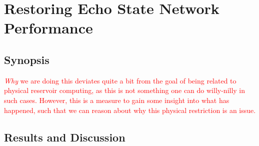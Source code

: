 \section{Restoring Echo State Network Performance}

\subsection{Synopsis}

\textcolor{red}{
  \textit{Why} we are doing this deviates quite a bit from the goal of being
related to physical reservoir computing, as this is not something one can do
willy-nilly in such cases. However, this is a measure to gain some insight into
what has happened, such that we can reason about why this physical restriction
is an issue.
}

\subsection{Results and Discussion}

